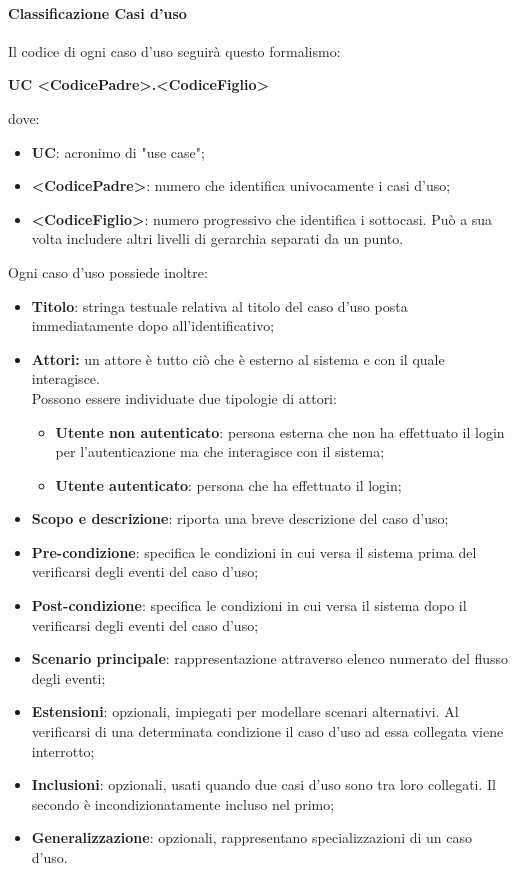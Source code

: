 			\paragraph{Classificazione Casi d’uso}
				Il codice di ogni caso d'uso seguirà questo formalismo:
				\begin{center}
					\textbf{UC <CodicePadre>.<CodiceFiglio>}
				\end{center}
				dove:
				\begin{itemize}
					\item\textbf{UC}: acronimo di "use case";
					\item\textbf{<CodicePadre>}: numero che identifica univocamente i casi d'uso;
					\item\textbf{<CodiceFiglio>}: numero progressivo che identifica i sottocasi. Può a sua volta includere altri livelli di gerarchia separati da un punto.
				\end{itemize}
				Ogni caso d’uso possiede inoltre:
				\begin{itemize}
					\item\textbf{Titolo}: stringa testuale relativa al titolo del caso d’uso posta immediatamente dopo all’identificativo;
					\item\textbf{Attori:} un attore è tutto ciò che è esterno al sistema e con il quale interagisce. \\
						Possono essere individuate due tipologie di attori:
						\begin{itemize}
							\item\textbf{Utente non autenticato}: persona esterna che non ha effettuato il login per l’autenticazione ma che interagisce con il sistema;
							\item\textbf{Utente autenticato}: persona che ha effettuato il login;
						\end{itemize}
					\item\textbf{Scopo e descrizione}: riporta una breve descrizione del caso d’uso;
					\item\textbf{Pre-condizione}: specifica le condizioni in cui versa il sistema prima del verificarsi degli eventi del caso d’uso;
					\item\textbf{Post-condizione}: specifica le condizioni in cui versa il sistema dopo il verificarsi degli eventi del caso d’uso;
					\item\textbf{Scenario principale}: rappresentazione attraverso elenco numerato del flusso degli eventi;
					\item\textbf{Estensioni}: opzionali, impiegati per modellare scenari alternativi. Al verificarsi di una determinata condizione il caso d’uso ad essa collegata viene interrotto;
					\item\textbf{Inclusioni}: opzionali, usati quando due casi d’uso sono tra loro collegati. Il secondo è incondizionatamente incluso nel primo;
					\item\textbf{Generalizzazione}: opzionali, rappresentano specializzazioni di un caso d’uso.
				\end{itemize}
				
